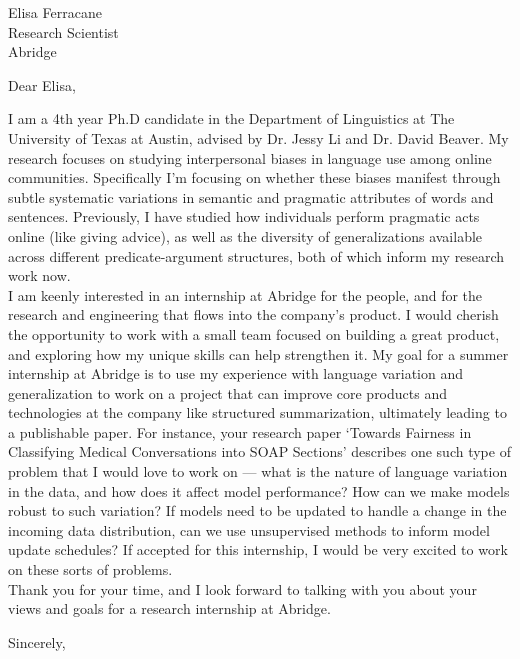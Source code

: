 \documentclass[myletter, a4paper, 11pt]{scrlttr2}
\begin{document}
\begin{letter}{
    Elisa Ferracane\\
    Research Scientist\\
    Abridge
}


\opening{Dear Elisa,}

I am a 4th year Ph.D candidate in the Department of Linguistics at The University of Texas at Austin, advised by Dr. Jessy Li and Dr. David Beaver. My research focuses on studying interpersonal biases in language use among online communities. Specifically I'm focusing on whether these biases manifest through subtle systematic variations in semantic and pragmatic attributes of words and sentences. Previously, I have studied how individuals perform pragmatic acts online (like giving advice), as well as the diversity of generalizations available across different predicate-argument structures, both of which inform my research work now.\\

I am keenly interested in an internship at Abridge for the people, and for the research and engineering that flows into the company's product. I would cherish the opportunity to work with a small team focused on building a great product, and exploring how my unique skills can help strengthen it. My goal for a summer internship at Abridge is to use my experience with language variation and generalization to work on a project that can improve core products and technologies at the company like structured summarization, ultimately leading to a publishable paper. For instance, your research paper `Towards Fairness in Classifying Medical Conversations into SOAP Sections' describes one such type of problem that I would love to work on --- what is the nature of language variation in the data, and how does it affect model performance? How can we make models robust to such variation? If models need to be updated to handle a change in the incoming data distribution, can we use unsupervised methods to inform model update schedules? If accepted for this internship, I would be very excited to work on these sorts of problems.\\

Thank you for your time, and I look forward to talking with you about your views and goals for a research internship at Abridge.

\closing{Sincerely,}


\end{letter}
\end{document}
